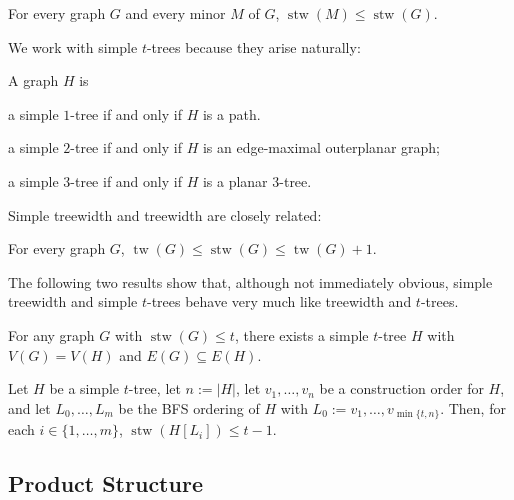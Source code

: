 \documentclass[kpfonts]{patmorin}
\DeclareMathOperator{\tw}{tw}
\DeclareMathOperator{\stw}{stw}
\theoremstyle{named}
\begin{document}
\begin{lem}\label{simple-minor-closed}
    For every graph $G$ and every minor $M$ of $G$, $\stw(M)\le\stw(G)$.
\end{lem}

We work with simple $t$-trees because they arise naturally:

\begin{lem}\label{simple-small-cases}
    A graph $H$ is
    \begin{compactenum}[(i)]
        \item a simple $1$-tree if and only if $H$ is a path.
        \item a simple $2$-tree if and only if $H$ is an edge-maximal outerplanar graph;
        \item a simple $3$-tree if and only if $H$ is a planar 3-tree.
    \end{compactenum}
\end{lem}

Simple treewidth and treewidth are closely related:

\begin{lem}\label{simple-treewidth-vs-treewidth}
    For every graph $G$, $\tw(G)\le \stw(G)\le \tw(G)+1$.
\end{lem}

The following two results show that, although not immediately obvious, simple treewidth and simple $t$-trees behave very much like treewidth and $t$-trees.

\begin{lem}\label{simple-subgraph}
    For any graph $G$ with $\stw(G)\le t$, there exists a simple $t$-tree $H$ with $V(G)= V(H)$ and $E(G)\subseteq E(H)$.
\end{lem}


\begin{lem}\label{simple-bfs-layers}
    Let $H$ be a simple $t$-tree, let $n:=|H|$, let $v_1,\ldots,v_n$ be a construction order for $H$, and let $L_0,\ldots,L_m$ be the BFS ordering of $H$ with $L_0:=v_1,\ldots,v_{\min\{t,n\}}$.   Then, for each $i\in\{1,\ldots,m\}$, $\stw(H[L_i])\le t-1$.
\end{lem}


\subsection{Product Structure}
\end{document}
